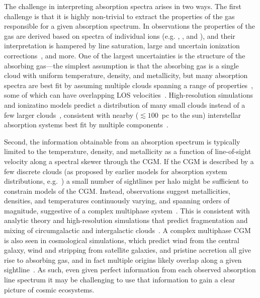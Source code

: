 \documentclass[fleqn,usenatbib]{mnras}
\begin{document}
The challenge in interpreting absorption spectra arises in two ways.
The first challenge is that it is highly non-trivial to extract the properties of the gas responsible for a given absorption spectrum.
In observations the properties of the gas are derived based on spectra of individual ions (e.g. , , and ), and their interpretation is hampered by line saturation, large and uncertain ionization corrections~\citep[e.g.][]{schaye2006Importance, acharya2021How}, and more.
One of the largest uncertainties is the structure of the absorbing gas---the simplest assumption is that the absorbing gas is a single cloud with uniform temperature, density, and metallicity, but many absorption spectra are best fit by assuming multiple clouds spanning a range of properties~\citep[e.g.][]{boksenberg1979Multiple, muzahid2015Extreme, liang2017BayesVP, Lehner2019,Wotta2019, haislmaier2021COS, sameer2021Cloudbycloud, zahedy2021.CUBS.III.zle1.LLSs, marra2021.cosmo.sims.test.observational.modeling, narayanan2021.a.multiphase.pLLS, nielsen2022.a.multiphase.DLA}, some of which can have overlapping LOS velocities~\citep[e.g.][]{marra2022Examining}.
High-resolution simulations and ionizatino models predict a distribution of many small clouds instead of a few larger clouds~\citep[e.g.][]{fielding2020Multiphase, vijayan2021Xray, lehner2019COS},
consistent with nearby ($\lesssim 100$~pc to the sun) interstellar absorption systems best fit by multiple components~\citep[e.g.][]{welsh2010HighResolution}.

Second, the information obtainable from an absorption spectrum is typically limited to the temperature, density, and metallicity as a function of line-of-sight velocity along a spectral skewer through the CGM.
If the CGM is described by a few discrete clouds (as proposed by earlier models for absorption system distributions, e.g.~\citealt{srianand1994Halo, das2001Unified, maller2003Damped}) a small number of sightlines per halo might be sufficient to constrain models of the CGM.
Instead, observations suggest metallicities, densities, and temperatures continuously varying, and spanning orders of magnitude, suggestive of a complex multiphase system~\citep{Lehner2019, Lehner2022}.
This is consistent with analytic theory and high-resolution simulations that predict fragmentation and mixing of circumgalactic and intergalactic clouds~\citep[e.g.][]{maller2004Multiphase, mccourt2018Characteristic, hummels2019Impact, vandevoort2019Cosmological, peeples2019Figuring, mandelker2019Shattering, mandelker2021Thermal}.
A complex multiphase CGM is also seen in cosmological simulations, which predict wind from the central galaxy, wind and stripping from satellite galaxies, and pristine accretion all give rise to absorbing gas, and in fact multiple origins likely overlap along a given sightline~\citep[e.g.][]{hafen2019Origins, hafen2020Fates}.
As such, even given perfect information from each observed absorption line spectrum it may be challenging to use that information to gain a clear picture of cosmic ecosystems.
\end{document}
